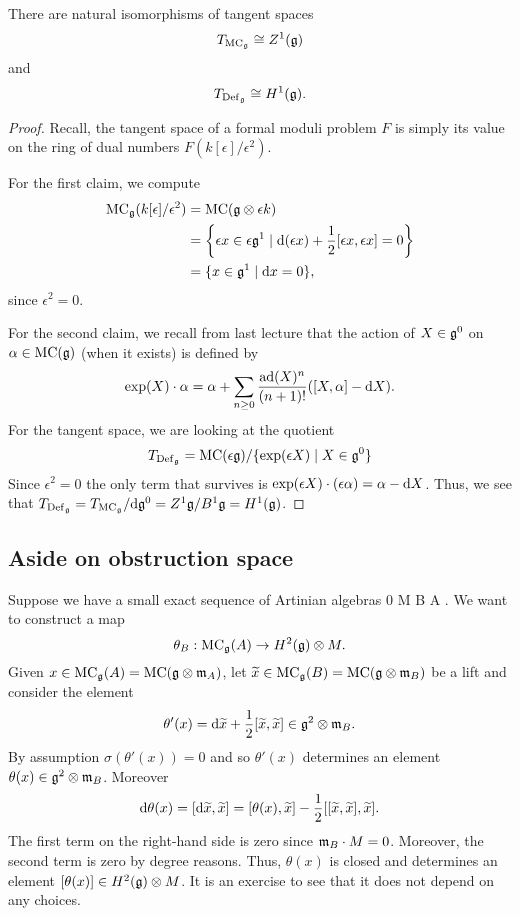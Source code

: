 \documentclass[11pt]{amsart}
\begin{document}
\begin{prop}
There are natural isomorphisms of tangent spaces
\[
T_{{\rm MC}_\mathfrak g} \cong Z^1(\mathfrak g)
\] 
and 
\[
T_{{\rm Def}_\mathfrak g} \cong H^1(\mathfrak g) .
\] 
\end{prop}
\begin{proof}
Recall, the tangent space of a formal moduli problem $F$ is simply its value on the ring of dual numbers $F(k[\epsilon]/\epsilon^2)$. 

For the first claim, we compute
\begin{align*}
{\rm MC}_\mathfrak g(k[\epsilon]/\epsilon^2) & = {\rm MC}(\mathfrak g \otimes \epsilon k) \\ & = \left\{\epsilon x \in \epsilon \mathfrak g^1 \; | \; {\rm d} (\epsilon x) + \frac{1}{2} [\epsilon x, \epsilon x] = 0 \right\} \\ & = \{x \in \mathfrak g^1 \; | \; {\rm d} x = 0\} ,
\end{align*}
since $\epsilon^2 = 0$. 

For the second claim, we recall from last lecture that the action of $X \in \mathfrak g^0$ on $\alpha \in {\rm MC}(\mathfrak g)$ (when it exists) is defined by 
\[
\exp(X) \cdot \alpha = \alpha + \sum_{n \geq 0} \frac{{\rm ad}(X)^n}{(n+1)!} ([X, \alpha] - {\rm d} X) .
\]
For the tangent space, we are looking at the quotient 
\[
T_{{\rm Def}_\mathfrak g} = {\rm MC}(\epsilon \mathfrak g) / \{\exp(\epsilon X) \; | \; X \in \mathfrak g^0\}
\] 
Since $\epsilon^2 = 0$ the only term that survives is $\exp(\epsilon X) \cdot (\epsilon \alpha) = \alpha - {\rm d} X$.
Thus, we see that $T_{{\rm Def}_\mathfrak g} = T_{{\rm MC}_\mathfrak g} / {\rm d} \mathfrak g^0 = Z^1 \mathfrak g / B^1 \mathfrak g = H^1(\mathfrak g)$. 
\end{proof}

\subsection{Aside on obstruction space}

Suppose we have a small exact sequence of Artinian algebras
\beqn\label{smallexact}
0 \to M \to B \xto{\sigma} A  .
\eeqn
We want to construct a map
\[
\theta_B : {\rm MC}_\mathfrak g(A) \to H^2(\mathfrak g) \otimes M .
\]
Given $x \in {\rm MC}_{\mathfrak g}(A) = {\rm MC}(\mathfrak g \otimes {\mathfrak m}_A)$, let $\widetilde{x} \in {\rm MC}_\mathfrak g(B) = {\rm MC}(\mathfrak g \otimes {\mathfrak m}_B)$ be a lift and consider the element 
\[
\theta'(x) = {\rm d} \widetilde{x} + \frac{1}{2}[\widetilde{x}, \widetilde{x}] \in \mathfrak g^2 \otimes {\mathfrak m}_B .
\] 
By assumption $\sigma(\theta'(x)) = 0$ and so $\theta'(x)$ determines an element $\theta(x) \in \mathfrak g^2 \otimes {\mathfrak m}_B$.
Moreover
\[
{\rm d} \theta(x) = [{\rm d} \widetilde{x}, \widetilde{x}] = [\theta(x), \widetilde{x}] - \frac{1}{2} [[\widetilde{x},\widetilde{x}],\widetilde{x}]  .
\]
The first term on the right-hand side is zero since ${\mathfrak m}_B \cdot M = 0$.
Moreover, the second term is zero by degree reasons. 
Thus, $\theta(x)$ is closed and determines an element $[\theta(x)] \in H^2(\mathfrak g) \otimes M$. 
It is an exercise to see that it does not depend on any choices. 
\end{document}
